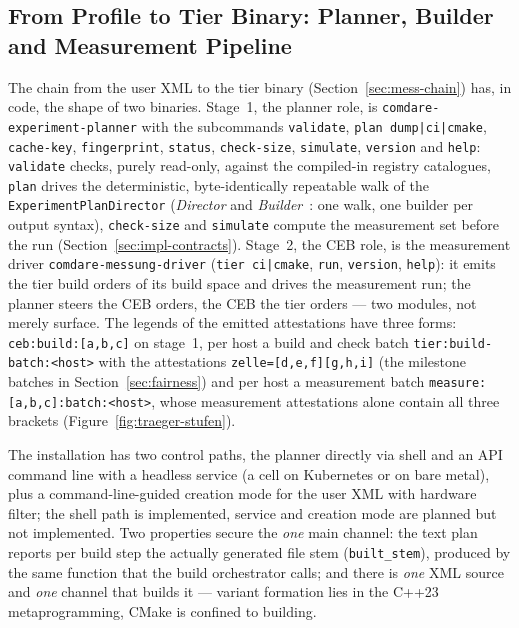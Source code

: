 \begin{nurkurz}
\subsection{From Profile to Tier Binary: Planner, Builder and Measurement Pipeline}\label{sec:impl-pipeline}
The chain from the user XML to the tier binary (Section~\ref{sec:mess-chain}) has, in code, the shape
of two binaries. Stage~1, the planner role, is \texttt{comdare-experiment-planner} with the subcommands
\texttt{validate}, \texttt{plan dump|ci|cmake}, \texttt{cache-key}, \texttt{fingerprint},
\texttt{status}, \texttt{check-size}, \texttt{simulate}, \texttt{version} and \texttt{help}:
\texttt{validate} checks, purely read-only, against the compiled-in registry catalogues, \texttt{plan}
drives the deterministic, byte-identically repeatable walk of the \texttt{ExperimentPlanDirector}
(\emph{Director} and \emph{Builder}~\cite{gamma1994patterns}: one walk, one builder per output syntax),
\texttt{check-size} and \texttt{simulate} compute the measurement set before the run
(Section~\ref{sec:impl-contracts}). Stage~2, the CEB role, is the measurement driver
\texttt{comdare-messung-driver} (\texttt{tier ci|cmake}, \texttt{run}, \texttt{version},
\texttt{help}): it emits the tier build orders of its build space and drives the measurement run; the
planner steers the CEB orders, the CEB the tier orders --- two modules, not merely surface. The legends
of the emitted attestations have three forms: \texttt{ceb:build:[a,b,c]} on stage~1, per host a build
and check batch \texttt{tier:build-batch:<host>} with the attestations \texttt{zelle=[d,e,f][g,h,i]}
(the milestone batches in Section~\ref{sec:fairness}) and per host a measurement batch
\texttt{measure:[a,b,c]:batch:<host>}, whose measurement attestations alone contain all three brackets
(Figure~\ref{fig:traeger-stufen}).

The installation has two control paths, the planner directly via shell and an API command line with a
headless service (a cell on Kubernetes or on bare metal), plus a command-line-guided creation mode for
the user XML with hardware filter; the shell path is implemented, service and creation mode are planned
but not implemented. Two properties secure the \emph{one} main channel: the text plan reports per build
step the actually generated file stem (\texttt{built\_stem}), produced by the same function that the
build orchestrator calls; and there is \emph{one} XML source and \emph{one} channel that builds it ---
variant formation lies in the C++23 metaprogramming, CMake is confined to building.


\end{nurkurz}
